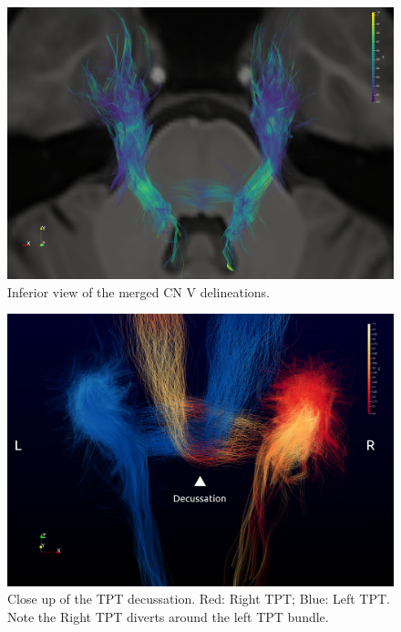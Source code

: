 \begin{figure}[ht]
\centering
\includegraphics[width=\linewidth]{cnv-inferior-view.png}
\caption{Inferior view of the merged CN V delineations.}
\label{fig:GPfigure1}
\end{figure}

\begin{figure}[ht]
\centering
\includegraphics[width=\linewidth]{view-decussation.png}
\caption{Close up of the TPT decussation. Red: Right TPT; Blue: Left TPT. Note the Right TPT diverts around the left TPT bundle. }
\label{fig:GPfigure2}
\end{figure}

